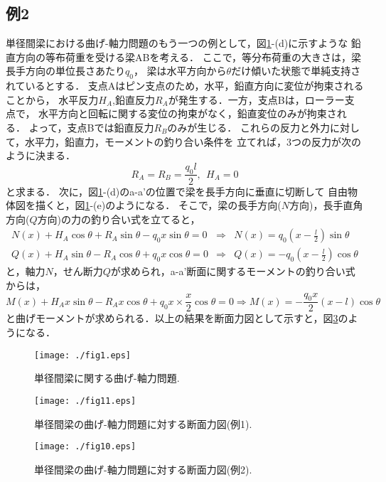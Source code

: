 \documentclass[10pt,a4j]{jbook}
\begin{document}
\subsection{例2}
単径間梁における曲げ-軸力問題のもう一つの例として，図\ref{fig:fig12_1}-(d)に示すような
鉛直方向の等布荷重を受ける梁ABを考える．
ここで，等分布荷重の大きさは，梁長手方向の単位長さあたり$q_0$，
梁は水平方向から$\theta$だけ傾いた状態で単純支持されているとする．
支点Aはピン支点のため，水平，鉛直方向に変位が拘束されることから，
水平反力$H_A$,鉛直反力$R_A$が発生する．一方，支点Bは，ローラー支点で，
水平方向と回転に関する変位の拘束がなく，鉛直変位のみが拘束される．
よって，支点Bでは鉛直反力$R_B$のみが生じる．
これらの反力と外力に対して，水平力，鉛直力，モーメントの釣り合い条件を
立てれば，3つの反力が次のように決まる．
\begin{equation}
	R_A=R_B=\frac{q_0l}{2}, \ \ H_A=0
\end{equation}
と求まる．
次に，図\ref{fig:fig12_1}-(d)のa-a'の位置で梁を長手方向に垂直に切断して
自由物体図を描くと，図\ref{fig:fig12_1}-(e)のようになる．
そこで，梁の長手方向($N$方向)，長手直角方向($Q$方向)の力の釣り合い式を立てると，
\begin{eqnarray}
	N(x)+H_A\cos\theta +R_A\sin\theta - q_0x\sin \theta =0 
	& \Rightarrow  & 
	N(x)=q_0\left(x-\frac{l}{2}\right)\sin\theta
	\\
	Q(x)+H_A\sin\theta -R_A\cos\theta +q_0x\cos \theta =0 
	& \Rightarrow  &  
	Q(x)=-q_0\left(x-\frac{l}{2}\right) \cos\theta	
\end{eqnarray}
と，軸力$N$，せん断力$Q$が求められ，a-a'断面に関するモーメントの釣り合い式からは，
\begin{equation}
	M(x)+H_Ax\sin\theta -R_Ax\cos\theta +q_0x\times \frac{x}{2}\cos \theta =0 
	\Rightarrow    
	M(x)=-\frac{q_0x}{2}\left(x-l\right)\cos\theta
\end{equation}
と曲げモーメントが求められる．以上の結果を断面力図として示すと，図\ref{fig:fig12_1_2}のようになる．
\begin{figure}[h]
	\begin{center}
	\texttt{[image: ./fig1.eps]} 
	\end{center}
	\caption{
		単径間梁に関する曲げ-軸力問題.
	} 
	\label{fig:fig12_1}
\end{figure}
\begin{figure}[h]
	\begin{center}
	\texttt{[image: ./fig11.eps]} 
	\end{center}
	\caption{
		単径間梁の曲げ-軸力問題に対する断面力図(例1).
	} 
	\label{fig:fig12_1_1}
\end{figure}
\begin{figure}[h]
	\begin{center}
	\texttt{[image: ./fig10.eps]} 
	\end{center}
	\caption{
		単径間梁の曲げ-軸力問題に対する断面力図(例2).
	} 
	\label{fig:fig12_1_2}
\end{figure}
\end{document}
